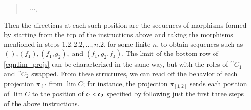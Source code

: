 \documentclass[Book-Poly]{subfiles}
\begin{document}
\begin{example}
\begin{quote}
\begin{enumerate}[label=1.\arabic*.]
\begin{enumerate}[label=2.\arabic*.]
\begin{enumerate}[label=3.\arabic*.]
            $\quad \cdots$,
        \end{enumerate}
    \end{enumerate}
\end{enumerate}
\end{quote}
Then the directions at each such position are the sequences of morphisms formed by starting from the top of the instructions above and taking the morphisms mentioned in steps $1.2, 2.2, \ldots, n.2$, for some finite $n$, to obtain sequences such as $(), (f_1), (f_1, g_2),$ and $(f_1, g_2, f_3)$.
The limit of the bottom row of \eqref{eqn.lim_projs} can be characterized in the same way, but with the roles of $\cat{C}_1$ and $\cat{C}_2$ swapped.
From these structures, we can read off the behavior of each projection $\pi_{\ell'}$ from $\lim C$; for instance, the projection $\pi_{[1,2]}$ sends each position of $\lim C$ to the position of $\mathfrak{c}_1 \mathbin{\triangleleft} \mathfrak{c}_2$ specified by following just the first three steps of the above instructions.


\end{example}
\end{document}
